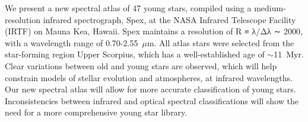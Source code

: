 We present a new spectral atlas of 47 young stars, compiled using a medium-resolution infrared spectrograph, Spex, at the NASA Infrared Telescope Facility (IRTF) on Mauna Kea, Hawaii.  
Spex maintains a resolution of R ≡ λ/Δλ ∼ 2000, with a wavelength range of 0.70-2.55~$\mu$m. 
All atlas stars were selected from the star-forming region Upper Scorpius, which has a well-established age of $\sim$11~Myr. Clear variations between old and young stars are observed, which will help constrain models of stellar evolution and atmospheres, at infrared wavelengths. Our new spectral atlas will allow for more accurate classification of young stars.  Inconsistencies between infrared and optical spectral classifications will show the need for a more comprehensive young star library.